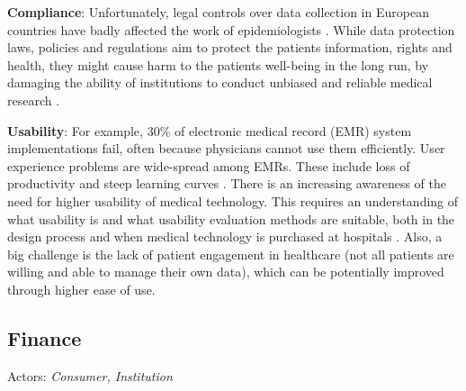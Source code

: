 \textbf{Compliance}: Unfortunately, legal controls over data collection in European countries have badly affected the work of epidemiologists \cite{policies_epidem}. While data protection laws, policies and regulations aim to protect the patients information, rights and health, they might cause harm to the patients well-being in the long run, by damaging the ability of institutions to conduct unbiased and reliable medical research \cite{epidemiological_research,policies_epidem_journalism}. \newline

\textbf{Usability}: For example, 30\% of electronic medical record (EMR) system implementations fail, often because physicians cannot use them efficiently. User experience problems are wide-spread among EMRs. These include loss of productivity and steep learning curves \cite{health_usability_1}. There is an increasing awareness of the need for higher usability of medical technology. This requires an understanding of what usability is and what usability evaluation methods are suitable, both in the design process and when medical technology is purchased at hospitals \cite{health_usability_2}. Also, a big challenge is the lack of patient engagement in healthcare (not all patients are willing and able to manage their own data), which can be potentially improved through higher ease of use.



\subsection{Finance}
\label{ssec:finance}

Actors: \textit{Consumer, Institution}\newline

